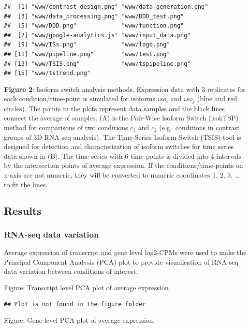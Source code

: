 \documentclass[]{article}
\begin{document}
\begin{verbatim}
##  [1] "www/contrast_design.png" "www/data_generation.png"
##  [3] "www/data_processing.png" "www/DDD_test.png"       
##  [5] "www/DDD.png"             "www/function.png"       
##  [7] "www/google-analytics.js" "www/input_data.png"     
##  [9] "www/ISs.png"             "www/logo.png"           
## [11] "www/pipeline.png"        "www/test.png"           
## [13] "www/TSIS.png"            "www/tspipeline.png"     
## [15] "www/tstrend.png"
\end{verbatim}

\textbf{Figure 2}: Isoform switch analysis methods. Expression data with
3 replicates for each condition/time-point is simulated for isoforms
\(iso_{i}\) and \(iso_j\) (blue and red circles). The points in the
plots represent data samples and the black lines connect the average of
samples. (A) is the Pair-Wise Isoform Switch (isokTSP) method for
comparisons of two conditions \(c_1\) and \(c_2\) (e.g.~conditions in
contrast groups of 3D RNA-seq analysis). The Time-Series Isoform Switch
(TSIS) tool is designed for detection and characterization of isoform
switches for time series data shown in (B). The time-series with 6
time-points is divided into 4 intervals by the intersection points of
average expression. If the conditions/time-points on x-axis are not
numeric, they will be converted to numeric coordinates 1, 2, 3, \ldots{}
to fit the lines.

\subsection{Results}\label{results}

\subsubsection{RNA-seq data variation}\label{rna-seq-data-variation}

Average expression of transcript and gene level log2-CPMs were used to
make the Principal Component Analysis (PCA) plot to provide
visualisation of RNA-seq data variation between conditions of interest.

Figure: Transcript level PCA plot of average expression.

\begin{verbatim}
## Plot is not found in the figure folder
\end{verbatim}

Figure: Gene level PCA plot of average expression.
\end{document}
